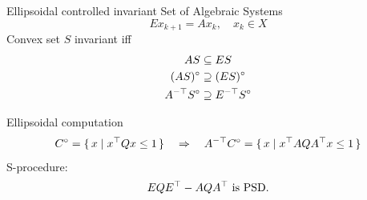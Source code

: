 \begin{frame}{Ellipsoidal controlled invariant Set of Algebraic Systems}
  \[ E x_{k+1} = A x_k, \quad x_k \in X \]
  Convex set $S$ invariant iff
  \begin{align*}
    AS & \subseteq ES\\
    (AS)^\circ & \supseteq (ES)^\circ\\
    A^{-\top}S^\circ & \supseteq E^{-\top}S^\circ
  \end{align*}
  \begin{block}{Ellipsoidal computation}
    \[ C^\circ = \{\, x \mid x^\top Q x \le 1 \,\} \quad \Rightarrow \quad A^{-\top}C^\circ = \{\, x \mid x^\top A Q A^\top x \le 1 \,\} \]
    S-procedure:
    \[ E Q E^\top - A Q A^\top \text{ is PSD}. \]
  \end{block}
\end{frame}
